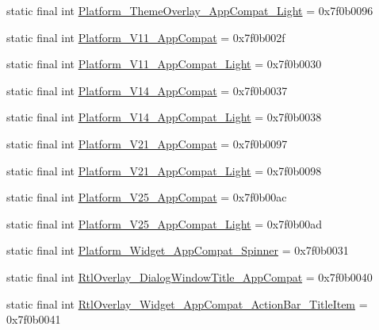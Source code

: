 \begin{CompactItemize}
\item 
static final int \hyperlink{classandroid_1_1support_1_1v7_1_1recyclerview_1_1_r_1_1style_fba4bc167a6735cdb425c73f7bc8f1c2}{Platform\_\-ThemeOverlay\_\-AppCompat\_\-Light} = 0x7f0b0096
\item 
static final int \hyperlink{classandroid_1_1support_1_1v7_1_1recyclerview_1_1_r_1_1style_da433fa63d2a4930d262247ec52299c7}{Platform\_\-V11\_\-AppCompat} = 0x7f0b002f
\item 
static final int \hyperlink{classandroid_1_1support_1_1v7_1_1recyclerview_1_1_r_1_1style_d5988c957a2c554e0306486d2127fc8d}{Platform\_\-V11\_\-AppCompat\_\-Light} = 0x7f0b0030
\item 
static final int \hyperlink{classandroid_1_1support_1_1v7_1_1recyclerview_1_1_r_1_1style_db0d3f3936e6fa898f58c3728c6a3c12}{Platform\_\-V14\_\-AppCompat} = 0x7f0b0037
\item 
static final int \hyperlink{classandroid_1_1support_1_1v7_1_1recyclerview_1_1_r_1_1style_a79104e553a8791a8d4371e8ed5b0665}{Platform\_\-V14\_\-AppCompat\_\-Light} = 0x7f0b0038
\item 
static final int \hyperlink{classandroid_1_1support_1_1v7_1_1recyclerview_1_1_r_1_1style_cf23e925d0250d16452c92b98bd8b011}{Platform\_\-V21\_\-AppCompat} = 0x7f0b0097
\item 
static final int \hyperlink{classandroid_1_1support_1_1v7_1_1recyclerview_1_1_r_1_1style_e4ae41df88008920dc8c3154e0a1f0d4}{Platform\_\-V21\_\-AppCompat\_\-Light} = 0x7f0b0098
\item 
static final int \hyperlink{classandroid_1_1support_1_1v7_1_1recyclerview_1_1_r_1_1style_96755dce5a8633c0dfec97f586d86f83}{Platform\_\-V25\_\-AppCompat} = 0x7f0b00ac
\item 
static final int \hyperlink{classandroid_1_1support_1_1v7_1_1recyclerview_1_1_r_1_1style_738855dc983150d5c57c17aba2c9875a}{Platform\_\-V25\_\-AppCompat\_\-Light} = 0x7f0b00ad
\item 
static final int \hyperlink{classandroid_1_1support_1_1v7_1_1recyclerview_1_1_r_1_1style_3d559c5a067198775b74532c39edef1a}{Platform\_\-Widget\_\-AppCompat\_\-Spinner} = 0x7f0b0031
\item 
static final int \hyperlink{classandroid_1_1support_1_1v7_1_1recyclerview_1_1_r_1_1style_820ebf4e26310e00f9998471860da490}{RtlOverlay\_\-DialogWindowTitle\_\-AppCompat} = 0x7f0b0040
\item 
static final int \hyperlink{classandroid_1_1support_1_1v7_1_1recyclerview_1_1_r_1_1style_59ac6f450b505d26f56efe6b404003f2}{RtlOverlay\_\-Widget\_\-AppCompat\_\-ActionBar\_\-TitleItem} = 0x7f0b0041

\end{CompactItemize}
